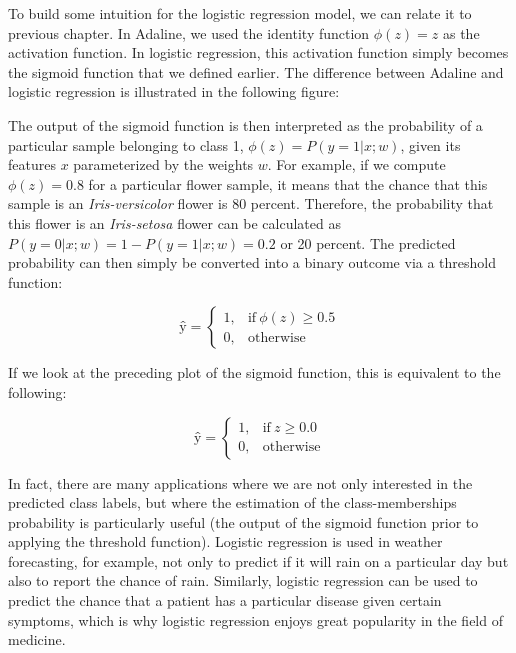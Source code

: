 \documentclass[11pt]{article}
\begin{document}
To build some intuition for the logistic regression model, we can relate
it to previous chapter. In Adaline, we used the identity function
\(\phi(z) = z\) as the activation function. In logistic regression, this
activation function simply becomes the sigmoid function that we defined
earlier. The difference between Adaline and logistic regression is
illustrated in the following figure:

    The output of the sigmoid function is then interpreted as the
probability of a particular sample belonging to class 1,
\(\phi(z) = P(y = 1 | x;w)\), given its features \(x\) parameterized by
the weights \(w\). For example, if we compute \(\phi(z) = 0.8\) for a
particular flower sample, it means that the chance that this sample is
an \emph{Iris-versicolor} flower is 80 percent. Therefore, the
probability that this flower is an \emph{Iris-setosa} flower can be
calculated as \(P(y = 0 | x;w) = 1 - P(y = 1 | x;w) = 0.2\) or 20
percent. The predicted probability can then simply be converted into a
binary outcome via a threshold function:

\begin{equation}
ŷ = 
\begin{cases}
   1, & \text{if}\ \phi(z) \ge 0.5 \\
   0, & \text{otherwise}
\end{cases}
\end{equation}

If we look at the preceding plot of the sigmoid function, this is
equivalent to the following:

\begin{equation}
ŷ = 
\begin{cases}
   1, & \text{if}\ z \ge 0.0 \\
   0, & \text{otherwise}
\end{cases}
\end{equation}

In fact, there are many applications where we are not only interested in
the predicted class labels, but where the estimation of the
class-memberships probability is particularly useful (the output of the
sigmoid function prior to applying the threshold function). Logistic
regression is used in weather forecasting, for example, not only to
predict if it will rain on a particular day but also to report the
chance of rain. Similarly, logistic regression can be used to predict
the chance that a patient has a particular disease given certain
symptoms, which is why logistic regression enjoys great popularity in
the field of medicine.
\end{document}

